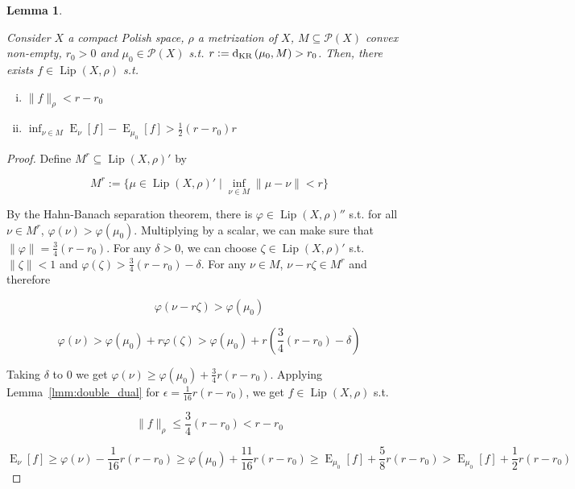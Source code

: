\documentclass[11pt]{article}
\theoremstyle{definition}
\theoremstyle{plain}
\newtheorem{lemma}{Lemma}%
\newcommand{\N}[1]{\lVert #1 \rVert}
\DeclareMathOperator{\E}{E}
\newcommand{\PM}{\mathcal{P}}
\newcommand{\Lp}{{\operatorname{Lip}}}
\newcommand{\DKR}{\operatorname{d}_{\textnormal{KR}}}
\begin{document}
\begin{samepage}
\begin{lemma}
\label{lmm:separation}

Consider $X$ a compact Polish space, $\rho$ a metrization of $X$, $M \subseteq \PM\left(X\right)$ convex non-empty, $r_0 > 0$ and $\mu_0 \in \PM\left(X\right)$ s.t. $r:=\DKR\left(\mu_0,M\right) > r_0$. Then, there exists $f \in \Lp\left(X,\rho\right)$ s.t.

\begin{enumerate}[i.]

\item $\N{f}_\rho < r - r_0$
\item $\inf_{\nu \in M} \E_\nu\left[f\right] - \E_{\mu_0}\left[f\right] > \frac{1}{2}\left(r-r_0\right)r$

\end{enumerate}

\end{lemma}
\end{samepage}

\begin{proof}

Define $M^r \subseteq \Lp\left(X,\rho\right)'$ by

$$M^r:=\{\mu \in \Lp\left(X,\rho\right)' \mid \inf_{\nu \in M} \N{\mu - \nu} < r\}$$

By the Hahn-Banach separation theorem, there is $\varphi \in \Lp\left(X,\rho\right)''$ s.t. for all $\nu \in M^r$, $\varphi\left(\nu\right) > \varphi\left(\mu_0\right)$. Multiplying by a scalar, we can make sure that $\N{\varphi} = \frac{3}{4}\left(r - r_0\right)$. For any $\delta > 0$, we can choose $\zeta \in \Lp\left(X,\rho\right)'$ s.t. $\N{\zeta} < 1$ and $\varphi\left(\zeta\right) > \frac{3}{4}\left(r-r_0\right) - \delta$.  For any $\nu \in M$, $\nu - r \zeta \in M^r$ and therefore

$$\varphi\left(\nu - r \zeta\right) > \varphi\left(\mu_0\right)$$

$$\varphi\left(\nu\right) > \varphi\left(\mu_0\right) + r \varphi\left(\zeta\right) > \varphi\left(\mu_0\right) + r \left(\frac{3}{4}\left(r-r_0\right) - \delta\right)$$

Taking $\delta$ to 0 we get $\varphi\left(\nu\right) \geq \varphi\left(\mu_0\right) + \frac{3}{4} r \left(r - r_0\right)$. Applying Lemma~\ref{lmm:double_dual} for $\epsilon = \frac{1}{16} r \left(r - r_0\right)$, we get $f \in \Lp\left(X,\rho\right)$ s.t.

$$\N{f}_\rho \leq \frac{3}{4} \left(r - r_0\right) < r - r_0$$ 

$$\E_\nu\left[f\right] \geq \varphi\left(\nu\right) - \frac{1}{16} r \left(r - r_0\right) \geq \varphi\left(\mu_0\right) + \frac{11}{16} r \left(r - r_0\right) \geq \E_{\mu_0}\left[f\right] +  \frac{5}{8} r \left(r - r_0\right) > \E_{\mu_0}\left[f\right] +  \frac{1}{2} r \left(r - r_0\right)$$
\end{proof}
\end{document}
